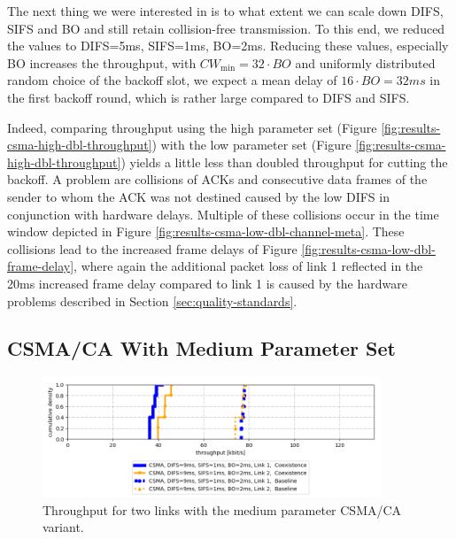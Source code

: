 The next thing we were interested in is to what extent we can scale down DIFS, SIFS and BO and still retain collision-free transmission. To this end, we reduced the values to DIFS=5ms, SIFS=1ms, BO=2ms. Reducing these values, especially BO increases the throughput, with $CW_\text{min} = 32 \cdot BO$ and uniformly distributed random choice of the backoff slot, we expect a mean delay of $16\cdot BO=32ms$ in the first backoff round, which is rather large compared to DIFS and SIFS.

 Indeed, comparing throughput using the high parameter set (Figure \ref{fig:results-csma-high-dbl-throughput}) with the low parameter set (Figure \ref{fig:results-csma-high-dbl-throughput}) yields a little less than doubled throughput for cutting the backoff. 
 A problem are collisions of ACKs and consecutive data frames of the sender to whom the ACK was not destined caused by the low DIFS in conjunction with hardware delays. Multiple of these collisions occur in the time window depicted in Figure \ref{fig:results-csma-low-dbl-channel-meta}. These collisions lead to the increased frame delays of Figure \ref{fig:results-csma-low-dbl-frame-delay}, where again the additional packet loss of link 1 reflected in the 20ms increased frame delay compared to link 1 is caused by the hardware problems described in Section \ref{sec:quality-standards}.

\subsection{CSMA/CA With Medium Parameter Set}

\begin{figure}[tb]
	\label{fig:results-csma-med-dbl-throughput}
	\begin{center}
		\includegraphics[width=0.9\textwidth]{pictures/results/same_combinations/csma_med_params/throughput_cdf}
	\end{center}
	\caption{Throughput for two links with the medium parameter CSMA/CA variant.}
\end{figure}

